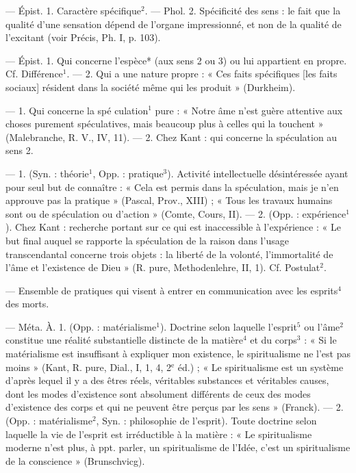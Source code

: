 \begin{itemize}[leftmargin=1cm, label=, itemsep=1pt]
 — Épist. 1. Caractère spécifique$^2$. — Phol. 2. Spécificité des
sens : le fait que la qualité d’une
sensation dépend de l'organe impressionné, et non de la qualité de
l’excitant (voir Précis, Ph. I, p. 103).

 — Épist. 1. Qui concerne
l’espèce* (aux sens 2 ou 3) ou lui
appartient en propre. Cf. Différence$^1$. — 2. Qui a une nature
propre : « Ces faits spécifiques [les
faits sociaux] résident dans la société même qui les produit » (Durkheim).

 — 1. Qui concerne la spé
culation$^1$ pure : « Notre âme n'est
guère attentive aux choses purement spéculatives, mais beaucoup
plus à celles qui la touchent » (Malebranche, R. V., IV, 11). — 2. Chez
Kant : qui concerne la spéculation
au sens 2.

 — 1. (Syn. : théorie$^1$, Opp. :
pratique$^3$). Activité intellectuelle désintéressée ayant pour seul but de
connaître : « Cela est permis dans la
spéculation, mais je n’en approuve
pas la pratique » (Pascal, Prov.,
XIII) ; « Tous les travaux humains
sont ou de spéculation ou d'action »
(Comte, Cours, II). — 2. (Opp. :
expérience$^1$). Chez Kant : recherche
portant sur ce qui est inaccessible à
l'expérience : « Le but final auquel
se rapporte la spéculation de la
raison dans l’usage transcendantal
concerne trois objets : la liberté de
la volonté, l’immortalité de l'âme
et l'existence de Dieu » (R. pure,
Methodenlehre, II, 1). Cf. Postulat$^2$.

 — Ensemble de pratiques
qui visent à entrer en communication avec les esprits$^4$ des
morts.

 — Méta. À. 1. (Opp. :
matérialisme$^1$). Doctrine selon laquelle l'esprit$^5$ ou l'âme$^2$ constitue
une réalité substantielle distincte
de la matière$^4$ et du corps$^3$ : « Si le
matérialisme est insuffisant à expliquer mon existence, le spiritualisme ne l’est pas moins » (Kant,
R. pure, Dial., I, 1, 4, 2$^\text{e}$ éd.) ; « Le
spiritualisme est un système d’après
lequel il y a des êtres réels, véritables
substances et véritables causes,
dont les modes d’existence sont
absolument différents de ceux des
modes d'existence des corps et qui
ne peuvent être perçus par les sens »
(Franck). — 2. (Opp. : matérialisme$^2$, Syn. : philosophie de l'esprit).
Toute doctrine selon laquelle la vie
de l'esprit est irréductible à la matière : « Le spiritualisme moderne
n’est plus, à ppt. parler, un spiritualisme de l’Idée, c’est un spiritualisme de la conscience » (Brunschvicg).


\end{itemize}

